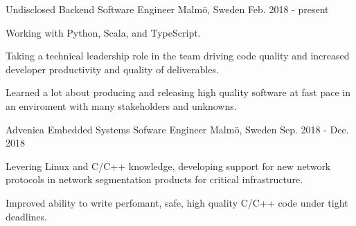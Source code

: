 


\begin{cventries}


\cventry
{Undisclosed} %
{Backend Software Engineer} %
{Malmö, Sweden} %
{Feb. 2018 - present} %
{ %
\begin{cvitems}
\item {Working with Python, Scala, and TypeScript.}
\item {Taking a technical leadership role in the team driving code quality
       and increased developer productivity and quality of deliverables.}
\item {Learned a lot about producing and releasing high quality
       software at fast pace in an enviroment with many stakeholders and
       unknowns.}
\end{cvitems}
}


\cventry
{Advenica} %
{Embedded Systems Sofware Engineer} %
{Malmö, Sweden} %
{Sep. 2018 - Dec. 2018} %
{ %
\begin{cvitems}
\item {
Levering Linux and C/C++ knowledge, developing support for new network
protocols in network segmentation products for critical infrastructure.}
\item {
Improved ability to write perfomant, safe, high quality C/C++ code under tight
deadlines.}
\end{cvitems}
}

\end{cventries}
